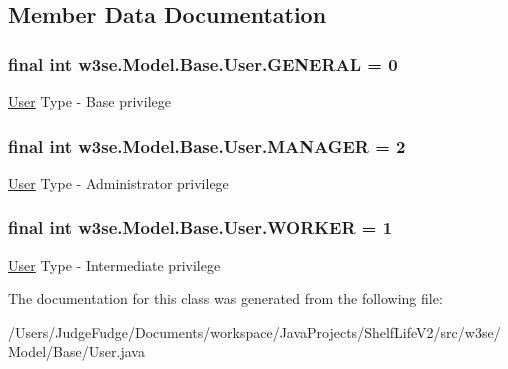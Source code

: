 \subsection{Member Data Documentation}
\hypertarget{classw3se_1_1_model_1_1_base_1_1_user_aa1af5bc3bc6b92df5f2c8415d6870747}{
\subsubsection[{G\-E\-N\-E\-R\-A\-L}]{\setlength{\rightskip}{0pt plus 5cm}final int w3se.\-Model.\-Base.\-User.\-G\-E\-N\-E\-R\-A\-L = 0\hspace{0.3cm}{\ttfamily [static]}}}\label{classw3se_1_1_model_1_1_base_1_1_user_aa1af5bc3bc6b92df5f2c8415d6870747}
\hyperlink{classw3se_1_1_model_1_1_base_1_1_user}{User} Type -\/ Base privilege \hypertarget{classw3se_1_1_model_1_1_base_1_1_user_a786806e82cb39e60733879d47b7fa4d1}{
\subsubsection[{M\-A\-N\-A\-G\-E\-R}]{\setlength{\rightskip}{0pt plus 5cm}final int w3se.\-Model.\-Base.\-User.\-M\-A\-N\-A\-G\-E\-R = 2\hspace{0.3cm}{\ttfamily [static]}}}\label{classw3se_1_1_model_1_1_base_1_1_user_a786806e82cb39e60733879d47b7fa4d1}
\hyperlink{classw3se_1_1_model_1_1_base_1_1_user}{User} Type -\/ Administrator privilege \hypertarget{classw3se_1_1_model_1_1_base_1_1_user_a521c9b3f5285b1cbf076f63aa9dcb075}{
\subsubsection[{W\-O\-R\-K\-E\-R}]{\setlength{\rightskip}{0pt plus 5cm}final int w3se.\-Model.\-Base.\-User.\-W\-O\-R\-K\-E\-R = 1\hspace{0.3cm}{\ttfamily [static]}}}\label{classw3se_1_1_model_1_1_base_1_1_user_a521c9b3f5285b1cbf076f63aa9dcb075}
\hyperlink{classw3se_1_1_model_1_1_base_1_1_user}{User} Type -\/ Intermediate privilege 

The documentation for this class was generated from the following file\-:\begin{DoxyCompactItemize}
\item 
/\-Users/\-Judge\-Fudge/\-Documents/workspace/\-Java\-Projects/\-Shelf\-Life\-V2/src/w3se/\-Model/\-Base/User.\-java\end{DoxyCompactItemize}
